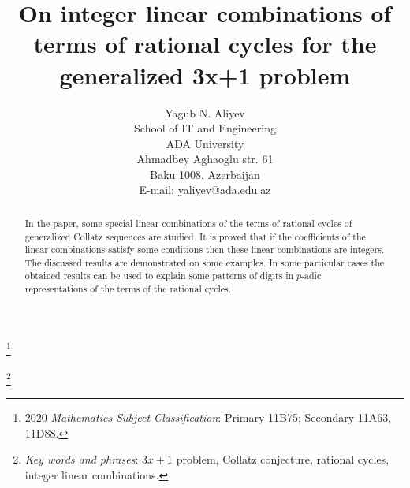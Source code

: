 \documentclass[12pt, twoside, leqno]{article}
\theoremstyle{definition}
\numberwithin{equation}{section}
\begin{document}

\baselineskip=17pt



\title{On integer linear combinations of terms of rational cycles for the generalized 3x+1 problem}

\author{Yagub N. Aliyev\\
School of IT and Engineering\\ 
ADA University\\
Ahmadbey Aghaoglu str. 61 \\
Baku 1008, Azerbaijan\\
E-mail: yaliyev@ada.edu.az}
\date{}

\maketitle


\renewcommand{\thefootnote}{}

\footnote{2020 \emph{Mathematics Subject Classification}: Primary 11B75; Secondary 11A63, 11D88.}

\footnote{\emph{Key words and phrases}: $3x+1$ problem, Collatz conjecture, rational cycles, integer linear combinations.}

\renewcommand{\thefootnote}{\arabic{footnote}}
\setcounter{footnote}{0}


\begin{abstract}
In the paper, some special linear combinations of the terms of rational cycles of generalized Collatz sequences are studied. It is proved that if the coefficients of the linear combinations satisfy some conditions then these linear combinations are integers. The discussed results are demonstrated on some examples. In some particular cases the obtained results can be used to explain some patterns of digits in $p$-adic representations of the terms of the rational cycles.
\end{abstract}
\end{document}
